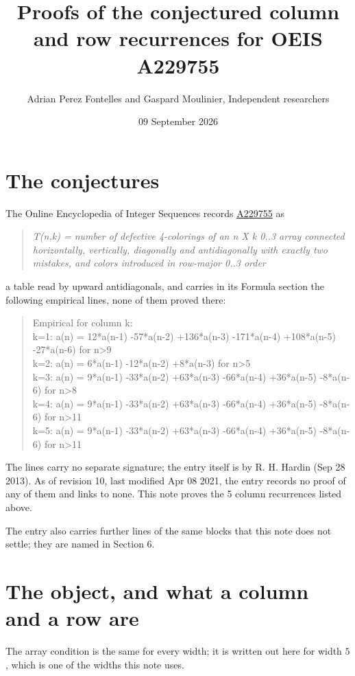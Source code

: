 \documentclass[11pt]{article}
\title{Proofs of the conjectured column and row recurrences for OEIS A229755}
\author{Adrian Perez Fontelles and Gaspard Moulinier, Independent researchers}
\date{09 September 2026}
\theoremstyle{definition}
\begin{document}
\maketitle
\section{The conjectures}

The Online Encyclopedia of Integer Sequences records \href{https://oeis.org/A229755}{A229755} as

\begin{quote}\itshape T(n,k) = number of defective 4-colorings of an n X k 0..3 array connected horizontally, vertically, diagonally and antidiagonally with exactly two mistakes, and colors introduced in row-major 0..3 order\end{quote}

a table read by upward antidiagonals, and carries in its Formula section the following empirical lines, none of them proved there:

\begin{quote}\ttfamily Empirical for column k:\\
k=1: a(n) = 12*a(n-1) -57*a(n-2) +136*a(n-3) -171*a(n-4) +108*a(n-5) -27*a(n-6) for n>9\\k=2: a(n) = 6*a(n-1) -12*a(n-2) +8*a(n-3) for n>5\\k=3: a(n) = 9*a(n-1) -33*a(n-2) +63*a(n-3) -66*a(n-4) +36*a(n-5) -8*a(n-6) for n>8\\k=4: a(n) = 9*a(n-1) -33*a(n-2) +63*a(n-3) -66*a(n-4) +36*a(n-5) -8*a(n-6) for n>11\\k=5: a(n) = 9*a(n-1) -33*a(n-2) +63*a(n-3) -66*a(n-4) +36*a(n-5) -8*a(n-6) for n>11\end{quote}

The lines carry no separate signature; the entry itself is by R. H. Hardin (Sep 28 2013). As of revision 10, last modified Apr 08 2021, the entry records no proof of any of them and links to none. This note proves the 5 column recurrences listed above.

The entry also carries further lines of the same blocks that this note does not settle; they are named in Section 6.

\section{The object, and what a column and a row are}

The array condition is the same for every width; it is written out here for width $5$, which is one of the widths this note uses.
\end{document}
